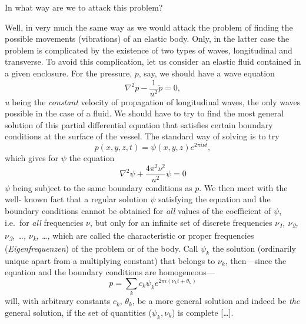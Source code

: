 In what way are we to attack this problem?

Well, in very much the same way as we would attack the problem of
finding the possible movements (vibrations) of an elastic body. Only, in
the latter case the problem is complicated by the existence of two types
of waves, longitudinal and transverse. To avoid this complication, let
us consider an elastic fluid contained in a given enclosure. For the
pressure, $p$, say, we should have a wave equation
\begin{equation}
\nabla^2p - \frac{1}{u^2}\ddot{p} = 0 , %
\end{equation}
\emph{u} being the \emph{constant} velocity of propagation of
longi­tudinal waves, the only waves possible in the case of a fluid. We
should have to try to find the most general solution of this partial
differential equation that satisfies certain boundary
conditions at the surface of the vessel. The
standard way of solving is to try
\begin{equation*}
p(x,y,z,t) = \psi(x,y,z)e^{2\pi i\nu t} ,
\end{equation*}
which gives for $\psi$ the equation
%
\begin{equation*}\tag{10'}
\nabla^2\psi + \frac{4\pi^2\nu^2}{u^2}\psi = 0
\end{equation*}
%
$\psi$ being subject to the same boundary conditions as $p$. We
then meet with the well- known fact that a regular solution $\psi$
satisfying the equation and the boundary conditions cannot be obtained
for \emph{all} values of the co­efficient of $\psi$, i.e.\ for
\emph{all} frequencies $\nu$, but only for an infinite set of
discrete frequencies \emph{$\nu$\textsubscript{1}, $\nu$\textsubscript{2},
$\nu$\textsubscript{3}, \ldots , $\nu$\textsubscript{k}, \ldots ,} which are
called the characteristic or proper
frequencies (\emph{Eigenfrequenzen}) of the problem or of the body.
Call $\psi_k$ the solution (ordinarily unique apart
from a multiplying constant) that belongs to $\nu_k$,
then---since the equation and the boundary conditions are homogeneous---
%
\begin{equation}
p = \sum_{k}c_k \psi_k e^{2\pi i(\nu_kt+\theta_k)} %
\end{equation}
%
will, with arbitrary constants $c_k$, $\theta_k$, be a more general solution and indeed be
\emph{the} general solution, if the set of quantities
($\psi_k, \nu_k$) is complete [\ldots].

